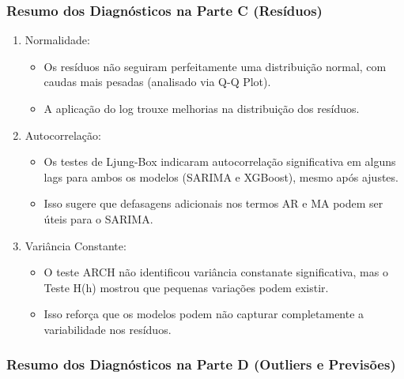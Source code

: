 \documentclass[a4paper, 12pt]{article}
\begin{document}
\subsubsection{Resumo dos Diagnósticos na Parte C (Resíduos)}

\begin{enumerate}
    \item Normalidade:
    \begin{itemize}
        \item Os resíduos não seguiram perfeitamente uma distribuição normal, com caudas mais pesadas (analisado via Q-Q Plot).
        \item A aplicação do log trouxe melhorias na distribuição dos resíduos.
    \end{itemize}
    \item Autocorrelação:
    \begin{itemize}
        \item Os testes de Ljung-Box indicaram autocorrelação significativa em alguns lags para ambos os modelos (SARIMA e XGBoost), mesmo após ajustes.
        \item Isso sugere que defasagens adicionais nos termos AR e MA podem ser úteis para o SARIMA.
    \end{itemize}
    \item Variância Constante:
    \begin{itemize}
        \item O teste ARCH não identificou variância constanate significativa, mas o Teste H(h) mostrou que pequenas variações podem existir.
        \item Isso reforça que os modelos podem não capturar completamente a variabilidade nos resíduos.
    \end{itemize}
\end{enumerate}

\subsubsection{Resumo dos Diagnósticos na Parte D (Outliers e Previsões)}
\end{document}
